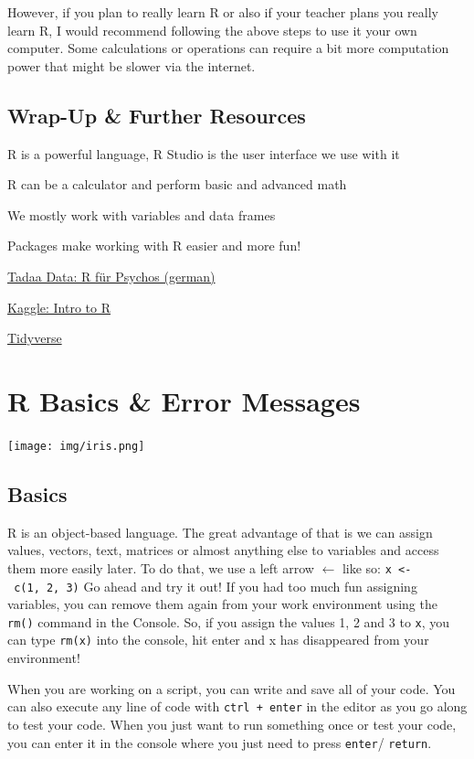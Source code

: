 \documentclass[
]{book}
\begin{document}
However, if you plan to really learn R or also if your teacher plans you really learn R, I would recommend following the above steps to use it your own computer.
Some calculations or operations can require a bit more computation power that might be slower via the internet.

\section*{Wrap-Up \& Further Resources}\label{wrap-up-further-resources}

R is a powerful language, R Studio is the user interface we use with it

R can be a calculator and perform basic and advanced math

We mostly work with variables and data frames

Packages make working with R easier and more fun!

\href{https://r-intro.tadaa-data.de/index.html}{Tadaa Data: R für Psychos (german)}

\href{https://www.kaggle.com/code/hamelg/intro-to-r-part-4-variables}{Kaggle: Intro to R}

\href{https://www.tidyverse.org/}{Tidyverse}

\chapter{R Basics \& Error Messages}\label{basics}

\texttt{[image: img/iris.png]}

\section{Basics}\label{basics-1}

R is an object-based language.
The great advantage of that is we can assign values, vectors, text, matrices or almost anything else to variables and access them more easily later.
To do that, we use a left arrow \(\leftarrow\) like so:
\texttt{x\ \textless{}-\ c(1,\ 2,\ 3)}
Go ahead and try it out!
If you had too much fun assigning variables, you can remove them again from your work environment using the \texttt{rm()} command in the Console.
So, if you assign the values 1, 2 and 3 to \texttt{x}, you can type \texttt{rm(x)} into the console, hit enter and x has disappeared from your environment!

When you are working on a script, you can write and save all of your code.
You can also execute any line of code with \texttt{ctrl\ +\ enter} in the editor as you go along to test your code.
When you just want to run something once or test your code, you can enter it in the console where you just need to press \texttt{enter}/ \texttt{return}.
\end{document}
